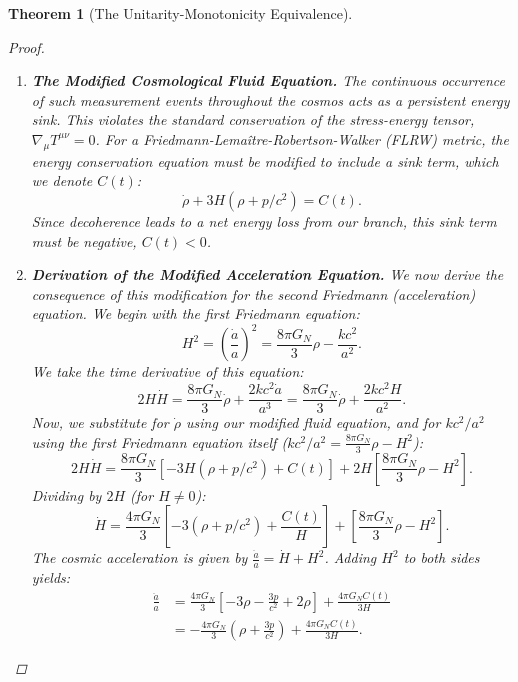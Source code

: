 \documentclass[11pt, letterpaper]{report}
\theoremstyle{plain} %
\newtheorem{theorem}{Theorem}[chapter]
\theoremstyle{definition} %
\theoremstyle{remark} %
\begin{document}
\begin{theorem}[The Unitarity-Monotonicity Equivalence]
\begin{proof}
\begin{enumerate}
    \item \textbf{The Modified Cosmological Fluid Equation.}
    The continuous occurrence of such measurement events throughout the cosmos acts as a persistent energy sink. This violates the standard conservation of the stress-energy tensor, $\nabla_\mu T^{\mu\nu}=0$. For a Friedmann-Lemaître-Robertson-Walker (FLRW) metric, the energy conservation equation must be modified to include a sink term, which we denote $C(t)$:
    \begin{equation}
        \dot{\rho} + 3H(\rho + p/c^2) = C(t).
    \end{equation}
    Since decoherence leads to a net energy loss from our branch, this sink term must be negative, $C(t) < 0$.

    \item \textbf{Derivation of the Modified Acceleration Equation.}
    We now derive the consequence of this modification for the second Friedmann (acceleration) equation. We begin with the first Friedmann equation:
    \begin{equation}
        H^2 = \left(\frac{\dot{a}}{a}\right)^2 = \frac{8\pi G_N}{3}\rho - \frac{k c^2}{a^2}.
    \end{equation}
    We take the time derivative of this equation:
    \begin{equation}
        2H\dot{H} = \frac{8\pi G_N}{3}\dot{\rho} + \frac{2k c^2 \dot{a}}{a^3} = \frac{8\pi G_N}{3}\dot{\rho} + \frac{2k c^2 H}{a^2}.
    \end{equation}
    Now, we substitute for $\dot{\rho}$ using our modified fluid equation, and for $k c^2/a^2$ using the first Friedmann equation itself ($k c^2/a^2 = \frac{8\pi G_N}{3}\rho - H^2$):
    \begin{equation}
        2H\dot{H} = \frac{8\pi G_N}{3}\left[-3H(\rho + p/c^2) + C(t)\right] + 2H\left[\frac{8\pi G_N}{3}\rho - H^2\right].
    \end{equation}
    Dividing by $2H$ (for $H \neq 0$):
    \begin{equation}
        \dot{H} = \frac{4\pi G_N}{3}\left[-3(\rho + p/c^2) + \frac{C(t)}{H}\right] + \left[\frac{8\pi G_N}{3}\rho - H^2\right].
    \end{equation}
    The cosmic acceleration is given by $\frac{\ddot{a}}{a} = \dot{H} + H^2$. Adding $H^2$ to both sides yields:
    \begin{align}
        \frac{\ddot{a}}{a} &= \frac{4\pi G_N}{3}\left[-3\rho - \frac{3p}{c^2} + 2\rho\right] + \frac{4\pi G_N C(t)}{3H} \\
        &= -\frac{4\pi G_N}{3}\left(\rho + \frac{3p}{c^2}\right) + \frac{4\pi G_N C(t)}{3H}.
        \label{eq:modified_acceleration_equation}
    \end{align}


\end{enumerate}
\end{proof}
\end{theorem}
\end{document}
